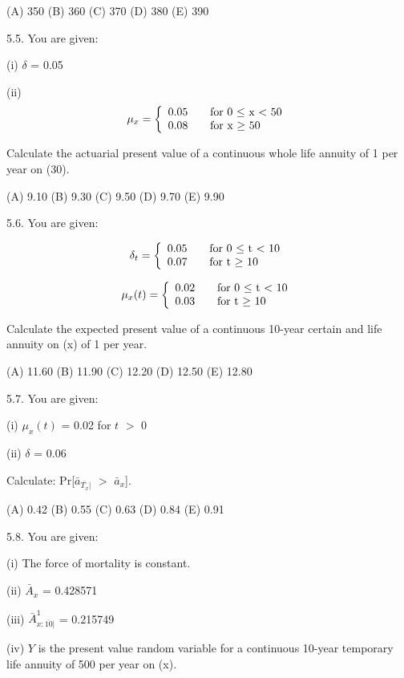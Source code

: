 \documentclass[]{book}
\begin{document}
(A) 350 (B) 360 (C) 370 (D) 380 (E) 390

5.5. You are given:

(i) \(\delta\) = 0.05

(ii) \[\mu_x = \left\{
  \begin{array}{l l}
    0.05 & \quad \text{for 0 $\le$ x $<$ 50}\\
    0.08 & \quad \text{for x $\ge$ 50}\\
  \end{array} \right.\]

Calculate the actuarial present value of a continuous whole life annuity
of 1 per year on (30).

(A) 9.10 (B) 9.30 (C) 9.50 (D) 9.70 (E) 9.90

5.6. You are given:

\[\delta_t = \left\{
  \begin{array}{l l}
    0.05 & \quad \text{for 0 $\le$ t $<$ 10}\\
    0.07 & \quad \text{for t $\ge$ 10}\\
  \end{array} \right.\]

\[\mu_x(t) = \left\{
  \begin{array}{l l}
    0.02 & \quad \text{for 0 $\le$ t $<$ 10}\\
    0.03 & \quad \text{for t $\ge$ 10}\\
  \end{array} \right.\]

Calculate the expected present value of a continuous 10-year certain and
life annuity on (x) of 1 per year.

(A) 11.60 (B) 11.90 (C) 12.20 (D) 12.50 (E) 12.80

5.7. You are given:

(i) \(\mu_x(t)\) = 0.02 for \(t\) \(>\) 0

(ii) \(\delta\) = 0.06

Calculate: Pr{[}\(\bar{a}_{\overline{T_{x}}|}\) \(>\)
\(\bar{a}_{x}\){]}.

(A) 0.42 (B) 0.55 (C) 0.63 (D) 0.84 (E) 0.91

5.8. You are given:

(i) The force of mortality is constant.

(ii) \(\bar{A}_x\) = 0.428571

(iii) \(\bar{A}_{x:\overline{10}|}^{1}\) = 0.215749

(iv) \(Y\) is the present value random variable for a continuous 10-year
temporary life annuity of 500 per year on (x).
\end{document}
